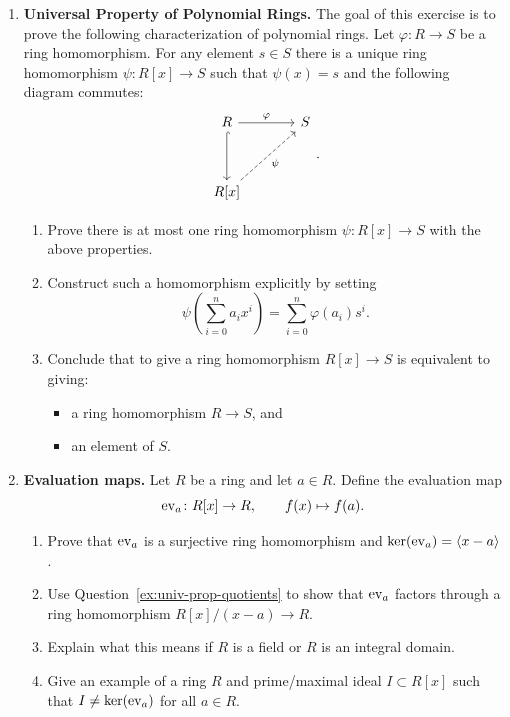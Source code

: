 \documentclass[12pt,reqno]{amsart}
\begin{document}
\begin{enumerate}[leftmargin=*]
\item \textbf{Universal Property of Polynomial Rings.} The goal of this exercise is to prove the following characterization of polynomial rings. Let $\varphi\colon R \to S$ be a ring homomorphism. For any element $s \in S$ there is a unique ring homomorphism $\psi\colon R[x] \to S$ such that $\psi(x) = s$ and the following diagram commutes:
\[
\begin{tikzcd}[row sep = 3.5em, column sep = 3.5em]
	R \arrow[r, "\varphi"] \arrow[d, hook] & S  \\
	R[x] \arrow[ur, dashed, swap,"\psi"]
\end{tikzcd}.
\]
\begin{enumerate}[label=(\alph*),ref=\theenumi\alph*]
    \item Prove there is at most one ring homomorphism $\psi:R[x] \to S$ with the above properties. 
    \item Construct such a homomorphism explicitly by setting
    \[
    \psi\!\left(\sum_{i=0}^n a_i x^i\right)=\sum_{i=0}^n \varphi(a_i)s^i.
    \]
    \item Conclude that to give a ring homomorphism $R[x]\to S$ is equivalent to giving:
    \begin{itemize}
        \item a ring homomorphism $R\to S$, and
        \item an element of $S$.
    \end{itemize}
\end{enumerate}

\item \textbf{Evaluation maps.} Let $R$ be a ring and let $a\in R$. Define the evaluation map
    \[
    \operatorname{ev}_a \colon R[x]\to R,
    \qquad
    f(x)\mapsto f(a).
    \]
    \begin{enumerate}[label=(\alph*),ref=\theenumi\alph*]
    \item Prove that $\operatorname{ev}_a$ is a surjective ring homomorphism and $\ker(\operatorname{ev}_a) = \langle x-a\rangle$.

    \item Use Question~\ref{ex:univ-prop-quotients} to show that $\operatorname{ev}_a$ factors through a ring homomorphism $R[x]/(x-a)\to R$.

    
    \item Explain what this means if $R$ is a field or $R$ is an integral domain.
    
    \item Give an example of a ring $R$ and prime/maximal ideal $I \subset R[x]$ such that $I \neq \ker(\operatorname{ev}_a)$ for all $a \in R$. 
\end{enumerate}

\end{enumerate}
\end{document}
